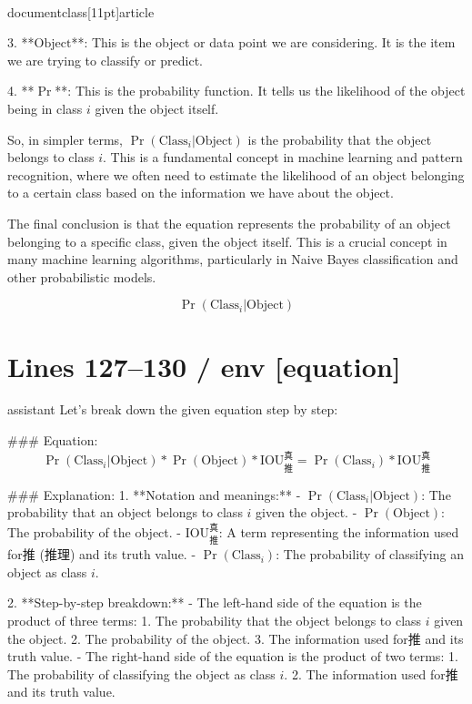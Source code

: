\\documentclass[11pt]{article}
\begin{document}
3. **\(\textrm{Object}\)**: This is the object or data point we are considering. It is the item we are trying to classify or predict.

4. **\(\Pr\)**: This is the probability function. It tells us the likelihood of the object being in class \(i\) given the object itself.

So, in simpler terms, \(\Pr(\textrm{Class}_i | \textrm{Object})\) is the probability that the object belongs to class \(i\). This is a fundamental concept in machine learning and pattern recognition, where we often need to estimate the likelihood of an object belonging to a certain class based on the information we have about the object.

The final conclusion is that the equation represents the probability of an object belonging to a specific class, given the object itself. This is a crucial concept in many machine learning algorithms, particularly in Naive Bayes classification and other probabilistic models.

\[
\boxed{\Pr(\textrm{Class}_i | \textrm{Object})}
\]


\section*{Lines 127–130 / env [equation]}
assistant
Let's break down the given equation step by step:

### Equation:
\[
\Pr(\textrm{Class}_i | \textrm{Object}) * \Pr(\textrm{Object}) * \textrm{IOU}_{\textrm{推}}^{\textrm{真}} = \Pr(\textrm{Class}_i) * \textrm{IOU}_{\textrm{推}}^{\textrm{真}}
\]

### Explanation:
1. **Notation and meanings:**
   - \(\Pr(\textrm{Class}_i | \textrm{Object})\): The probability that an object belongs to class \(i\) given the object.
   - \(\Pr(\textrm{Object})\): The probability of the object.
   - \(\textrm{IOU}_{\textrm{推}}^{\textrm{真}}\): A term representing the information used for推 (推理) and its truth value.
   - \(\Pr(\textrm{Class}_i)\): The probability of classifying an object as class \(i\).

2. **Step-by-step breakdown:**
   - The left-hand side of the equation is the product of three terms:
     1. The probability that the object belongs to class \(i\) given the object.
     2. The probability of the object.
     3. The information used for推 and its truth value.
   - The right-hand side of the equation is the product of two terms:
     1. The probability of classifying the object as class \(i\).
     2. The information used for推 and its truth value.
\end{document}
